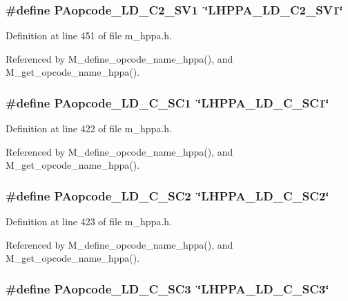 \subsubsection{\setlength{\rightskip}{0pt plus 5cm}\#define PAopcode\_\-LD\_\-C2\_\-SV1~\char`\"{}LHPPA\_\-LD\_\-C2\_\-SV1\char`\"{}}\label{m__hppa_8h_16f86bf03e46d7a86660fe3bf9cbf73b}




Definition at line 451 of file m\_\-hppa.h.

Referenced by M\_\-define\_\-opcode\_\-name\_\-hppa(), and M\_\-get\_\-opcode\_\-name\_\-hppa().
\subsubsection{\setlength{\rightskip}{0pt plus 5cm}\#define PAopcode\_\-LD\_\-C\_\-SC1~\char`\"{}LHPPA\_\-LD\_\-C\_\-SC1\char`\"{}}\label{m__hppa_8h_6905e67f959f7fc0424f0ce22df0a232}




Definition at line 422 of file m\_\-hppa.h.

Referenced by M\_\-define\_\-opcode\_\-name\_\-hppa(), and M\_\-get\_\-opcode\_\-name\_\-hppa().
\subsubsection{\setlength{\rightskip}{0pt plus 5cm}\#define PAopcode\_\-LD\_\-C\_\-SC2~\char`\"{}LHPPA\_\-LD\_\-C\_\-SC2\char`\"{}}\label{m__hppa_8h_1d2aff595f0d2d64c42c314fa0dfd182}




Definition at line 423 of file m\_\-hppa.h.

Referenced by M\_\-define\_\-opcode\_\-name\_\-hppa(), and M\_\-get\_\-opcode\_\-name\_\-hppa().
\subsubsection{\setlength{\rightskip}{0pt plus 5cm}\#define PAopcode\_\-LD\_\-C\_\-SC3~\char`\"{}LHPPA\_\-LD\_\-C\_\-SC3\char`\"{}}\label{m__hppa_8h_bffe8d4a37ac45990b1800c302af6f41}




